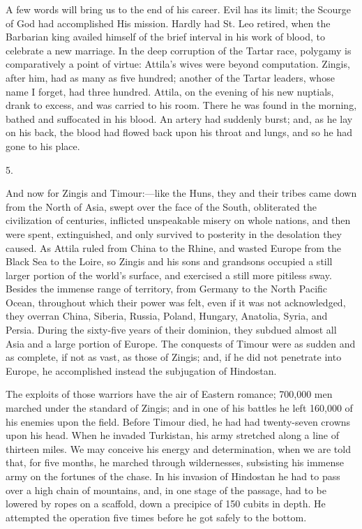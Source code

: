 A few words will bring us to
the end of his career. Evil has its limit; the Scourge of God had
accomplished His mission. Hardly had St. Leo retired, when the
Barbarian king availed himself of the brief interval in his work of
blood, to celebrate a new marriage. In the deep corruption of the
Tartar race, polygamy is comparatively a point of virtue: Attila's
wives were beyond computation. Zingis, after him, had as many as five
hundred; another of the Tartar leaders, whose name I forget, had three
hundred. Attila, on the evening of his new nuptials, drank to excess,
and was carried to his room. There he was found in the morning, bathed
and suffocated in his blood. An artery had suddenly burst; and, as he
lay on his back, the blood had flowed back upon his throat and lungs,
and so he had gone to his place.

5.

And now for Zingis and Timour:—like
the Huns, they and their tribes came down from the North of Asia,
swept over the face of the South, obliterated the civilization of
centuries, inflicted unspeakable misery on whole nations, and then
were spent, extinguished, and only survived to posterity in the
desolation they caused. As Attila ruled from China to the Rhine, and
wasted Europe from the Black Sea to the Loire, so Zingis and his sons
and grandsons occupied a still larger portion of the world's surface,
and exercised a still more pitiless sway. Besides the immense range of
territory, from Germany to the North Pacific Ocean, throughout which
their power was felt, even if it was not acknowledged, they overran
China, Siberia, Russia, Poland, Hungary, Anatolia, Syria, and Persia.
During the sixty-five years of their dominion, they subdued almost all
Asia and a large portion of Europe. The conquests of Timour were as
sudden and as complete, if not as vast, as those of Zingis; and, if he
did not penetrate into Europe, he accomplished instead the subjugation
of Hindostan.

The exploits of those warriors
have the air of Eastern romance; 700,000 men marched under the
standard of Zingis; and in one of his battles he left 160,000 of his
enemies upon the field. Before Timour died, he had had
twenty-seven crowns upon his head. When he invaded Turkistan, his army
stretched along a line of thirteen miles. We may conceive his energy
and determination, when we are told that, for five months, he marched
through wildernesses, subsisting his immense army on the fortunes of
the chase. In his invasion of Hindostan he had to pass over a high
chain of mountains, and, in one stage of the passage, had to be
lowered by ropes on a scaffold, down a precipice of 150 cubits in
depth. He attempted the operation five times before he got safely to
the bottom.

